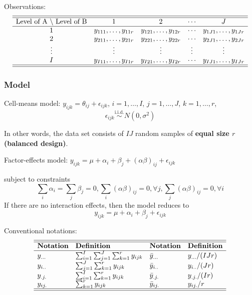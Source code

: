 \documentclass[11pt,a4paper]{article}
\begin{document}
Observations:
\[
\begin{array}{ccccc}
    \hline\hline
    \text{Level of A $\backslash$ Level of B} & 1 & 2 & \cdots & J \\
    \hline
    1 & y_{111},\dots,y_{11r} & y_{121},\dots,y_{12r} & \cdots & y_{1J1},\dots,y_{1Jr} \\
    2 & y_{211},\dots,y_{21r} & y_{221},\dots,y_{22r} & \cdots & y_{2J1},\dots,y_{2Jr} \\
    \vdots & \vdots & \vdots & \vdots & \vdots \\
    I & y_{I11},\dots,y_{I1r} & y_{I21},\dots,y_{I2r} & \cdots & y_{IJ1},\dots,y_{IJr} \\
    \hline\hline
\end{array}
\]

\subsubsection{Model}
Cell-means model: $y_{ijk} = \theta_{ij} + \epsilon_{ijk}$, $i = 1, \dots, I$, $j = 1, \dots, J$, $k = 1, \dots, r$, 
\[
\epsilon_{ijk} \overset{\text{i.i.d.}}{\sim} N(0, \sigma^2)
\]

In other words, the data set consists of $IJ$ random samples of \textbf{equal size $r$ (balanced design)}. \par

Factor-effects model: $y_{ijk} = \mu + \alpha_i + \beta_j + (\alpha \beta)_{ij} + \epsilon_{ijk}$ \par
subject to constraints
\[
\sum_i \alpha_i = \sum_j \beta_j = 0, \sum_i (\alpha \beta)_{ij} = 0, \forall j, \sum_j (\alpha \beta)_{ij} = 0, \forall i
\]
If there are no interaction effects, then the model reduces to
\[
y_{ijk} = \mu + \alpha_i + \beta_j + \epsilon_{ijk}
\]

Conventional notations:
\[
\begin{array}{llll}
    \hline\hline
    \textbf{Notation} & \textbf{Definition} & \textbf{Notation} & \textbf{Definition} \\
    \hline
    y_{...} & \sum_{i=1}^{I} \sum_{j=1}^{J} \sum_{k=1}^{r} y_{ijk} & \bar{y}_{...} & y_{...}/(IJr) \\
    y_{i..} & \sum_{j=1}^{J} \sum_{k=1}^{r} y_{ijk} & \bar{y}_{i..} & y_{i..}/(Jr) \\
    y_{.j.} & \sum_{i=1}^{I} \sum_{k=1}^{r} y_{ijk} & \bar{y}_{.j.} & y_{.j.}/(Ir) \\
    y_{ij.} & \sum_{k=1}^{r} y_{ijk} & \bar{y}_{ij.} & y_{ij.}/r \\
    \hline\hline
\end{array}
\]
\end{document}
